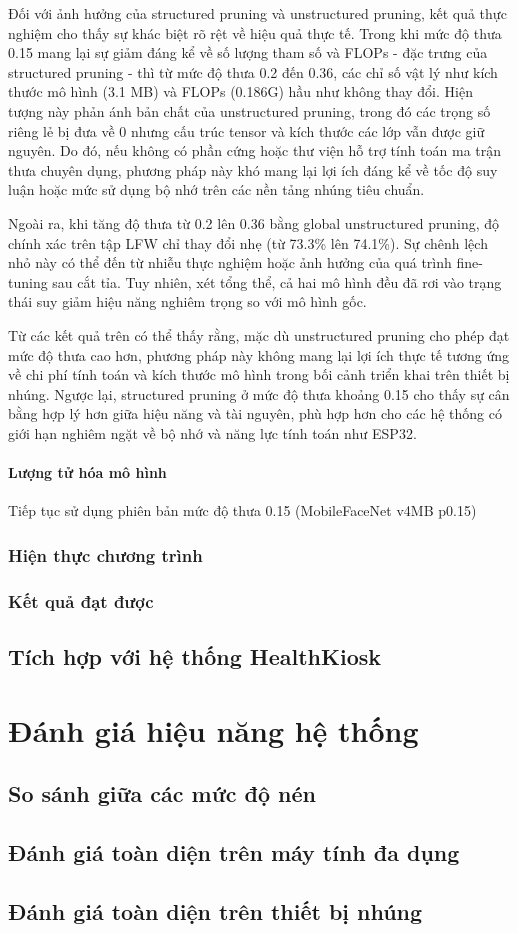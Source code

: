 Đối với ảnh hưởng của structured pruning và unstructured pruning, kết quả thực nghiệm cho thấy sự khác biệt rõ rệt về hiệu quả thực tế. Trong khi mức độ thưa 0.15 mang lại sự giảm đáng kể về số lượng tham số và FLOPs - đặc trưng của structured pruning - thì từ mức độ thưa 0.2 đến 0.36, các chỉ số vật lý như kích thước mô hình (3.1 MB) và FLOPs (0.186G) hầu như không thay đổi. Hiện tượng này phản ánh bản chất của unstructured pruning, trong đó các trọng số riêng lẻ bị đưa về 0 nhưng cấu trúc tensor và kích thước các lớp vẫn được giữ nguyên. Do đó, nếu không có phần cứng hoặc thư viện hỗ trợ tính toán ma trận thưa chuyên dụng, phương pháp này khó mang lại lợi ích đáng kể về tốc độ suy luận hoặc mức sử dụng bộ nhớ trên các nền tảng nhúng tiêu chuẩn.

Ngoài ra, khi tăng độ thưa từ 0.2 lên 0.36 bằng global unstructured pruning, độ chính xác trên tập LFW chỉ thay đổi nhẹ (từ 73.3\% lên 74.1\%). Sự chênh lệch nhỏ này có thể đến từ nhiễu thực nghiệm hoặc ảnh hưởng của quá trình fine-tuning sau cắt tỉa. Tuy nhiên, xét tổng thể, cả hai mô hình đều đã rơi vào trạng thái suy giảm hiệu năng nghiêm trọng so với mô hình gốc.

Từ các kết quả trên có thể thấy rằng, mặc dù unstructured pruning cho phép đạt mức độ thưa cao hơn, phương pháp này không mang lại lợi ích thực tế tương ứng về chi phí tính toán và kích thước mô hình trong bối cảnh triển khai trên thiết bị nhúng. Ngược lại, structured pruning ở mức độ thưa khoảng 0.15 cho thấy sự cân bằng hợp lý hơn giữa hiệu năng và tài nguyên, phù hợp hơn cho các hệ thống có giới hạn nghiêm ngặt về bộ nhớ và năng lực tính toán như ESP32.

\paragraph{Lượng tử hóa mô hình}
Tiếp tục sử dụng phiên bản mức độ thưa 0.15 (MobileFaceNet v4MB p0.15)
\subsubsection{Hiện thực chương trình}
\subsubsection{Kết quả đạt được}
\subsection{Tích hợp với hệ thống HealthKiosk}
\section{Đánh giá hiệu năng hệ thống}


\subsection{So sánh giữa các mức độ nén}
\subsection{Đánh giá toàn diện trên máy tính đa dụng}
\subsection{Đánh giá toàn diện trên thiết bị nhúng}


